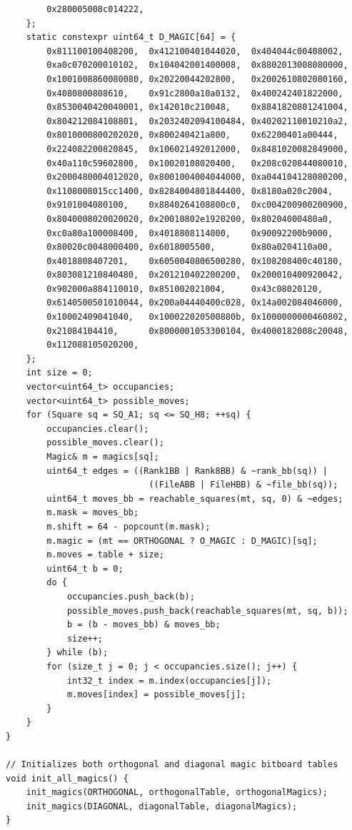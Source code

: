 \documentclass[12pt,a4paper,twoside,openright]{book}
\begin{document}
\begin{mdframed}[skipabove=\baselineskip,topline=false,rightline=false,bottomline=false,leftline=false,linewidth=1pt,linecolor=gray!40,innerleftmargin=8pt]
\begin{verbatim}
        0x280005008c014222,
    };
    static constexpr uint64_t D_MAGIC[64] = {
        0x811100100408200,  0x412100401044020,  0x404044c00408002,
        0xa0c070200010102,  0x104042001400008,  0x8802013008080000,
        0x1001008860080080, 0x20220044202800,   0x2002610802080160,
        0x4080800808610,    0x91c2800a10a0132,  0x400242401822000,
        0x8530040420040001, 0x142010c210048,    0x8841820801241004,
        0x804212084108801,  0x2032402094100484, 0x40202110010210a2,
        0x8010000800202020, 0x800240421a800,    0x62200401a00444,
        0x224082200820845,  0x106021492012000,  0x8481020082849000,
        0x40a110c59602800,  0x10020108020400,   0x208c020844080010,
        0x2000480004012020, 0x8001004004044000, 0xa044104128080200,
        0x1108008015cc1400, 0x8284004801844400, 0x8180a020c2004,
        0x9101004080100,    0x8840264108800c0,  0xc004200900200900,
        0x8040008020020020, 0x20010802e1920200, 0x80204000480a0,
        0xc0a80a100008400,  0x4018808114000,    0x90092200b9000,
        0x80020c0048000400, 0x6018005500,       0x80a0204110a00,
        0x4018808407201,    0x6050040806500280, 0x108208400c40180,
        0x803081210840480,  0x201210402200200,  0x200010400920042,
        0x902000a884110010, 0x851002021004,     0x43c08020120,
        0x6140500501010044, 0x200a04440400c028, 0x14a002084046000,
        0x10002409041040,   0x100022020500880b, 0x1000000000460802,
        0x21084104410,      0x8000001053300104, 0x4000182008c20048,
        0x112088105020200,
    };
    int size = 0;
    vector<uint64_t> occupancies;
    vector<uint64_t> possible_moves;
    for (Square sq = SQ_A1; sq <= SQ_H8; ++sq) {
        occupancies.clear();
        possible_moves.clear();
        Magic& m = magics[sq];
        uint64_t edges = ((Rank1BB | Rank8BB) & ~rank_bb(sq)) |
                            ((FileABB | FileHBB) & ~file_bb(sq));
        uint64_t moves_bb = reachable_squares(mt, sq, 0) & ~edges;
        m.mask = moves_bb;
        m.shift = 64 - popcount(m.mask);
        m.magic = (mt == ORTHOGONAL ? O_MAGIC : D_MAGIC)[sq];
        m.moves = table + size;
        uint64_t b = 0;
        do {
            occupancies.push_back(b);
            possible_moves.push_back(reachable_squares(mt, sq, b));
            b = (b - moves_bb) & moves_bb;
            size++;
        } while (b);
        for (size_t j = 0; j < occupancies.size(); j++) {
            int32_t index = m.index(occupancies[j]);
            m.moves[index] = possible_moves[j];
        }
    }
}

// Initializes both orthogonal and diagonal magic bitboard tables
void init_all_magics() {
    init_magics(ORTHOGONAL, orthogonalTable, orthogonalMagics);
    init_magics(DIAGONAL, diagonalTable, diagonalMagics);
}
\end{verbatim}
\label{lst:board_code_2}
\end{mdframed}
\end{document}
